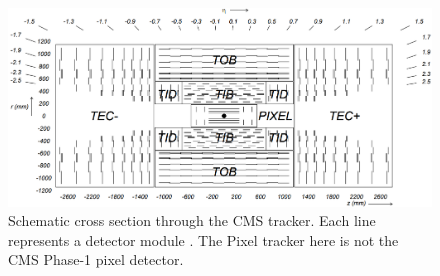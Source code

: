 \begin{center}
  \begin{figure}[ht]
    \centering
    \includegraphics[scale=.23]{Chapter2/strip_layout.png}
    \caption[Schematic cross section through the CMS tracker]{Schematic cross section through the CMS tracker. Each line represents a detector module \cite{CMS_Exp_2008}. The Pixel tracker here is not the CMS Phase-1 pixel detector.}
    \label{strip_layout}
  \end{figure}
\end{center}

